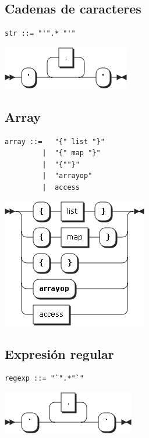 \subsection{Cadenas de caracteres}
\begin{multicols}{2}
\begin{lstlisting}[style=nonumbers]      
str ::= "'".* "'"
\end{lstlisting}  
\columnbreak	
\begin{center}
\includegraphics[scale=0.4]{diagram/str.png} \\
\end{center}
\end{multicols}

\subsection{Array}
\begin{multicols}{2}
\begin{lstlisting}[style=nonumbers]      
array ::=   "{" list "}"
         |  "{" map "}"
         |  "{""}"
         |  "arrayop"
         |  access
\end{lstlisting}  
\columnbreak	
\begin{center}
\includegraphics[scale=0.4]{diagram/array.png} \\
\end{center}
\end{multicols}

\subsection{Expresión regular}
\begin{multicols}{2}
\begin{lstlisting}[style=nonumbers]      
regexp ::= "`".*"`" 
\end{lstlisting}  
\columnbreak	
\begin{center}
\includegraphics[scale=0.4]{diagram/regexp.png} \\
\end{center}
\end{multicols}

